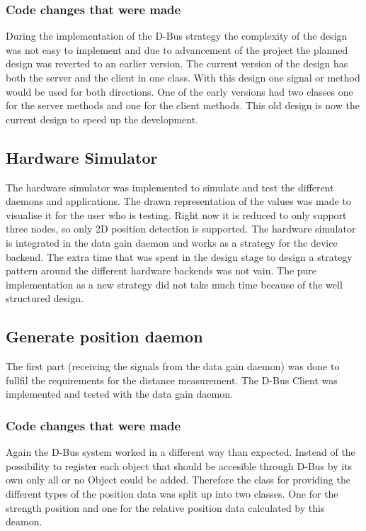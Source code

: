    \subsubsection*{Code changes that were made}
    During the implementation of the D-Bus strategy the complexity of the design was not easy to implement and due to advancement of the project the planned design was reverted to an earlier version. The current version of the design has both the server and the client in one class. With this design one signal or method would be used for both directions. One of the early versions had two classes one for the server methods and one for the client methods. This old design is now the current design to speed up the development.

  \subsection{Hardware Simulator}
   The hardware simulator was implemented to simulate and test the different daemons and applications. The drawn representation of the values was made to visualise it for the user who is testing. Right now it is reduced to only support three nodes, so only 2D position detection is supported. The hardware simulator is integrated in the data gain daemon and works as a strategy for the device backend. The extra time that was spent in the design stage to design a strategy pattern around the different hardware backends was not vain. The pure implementation as a new strategy did not take much time because of the well structured design.

  \subsection{Generate position daemon}
   The first part (receiving the signals from the data gain daemon) was done to fullfil the requirements for the distance measurement. The D-Bus Client was implemented and tested with the data gain daemon.

   \subsubsection*{Code changes that were made}
    Again the D-Bus system worked in a different way than expected. Instead of the possibility to register each object that should be accesible through D-Bus by its own only all or no Object could be added. Therefore the class for providing the different types of the position data was split up into two classes. One for the strength position and one for the relative position data calculated by this deamon.\\

